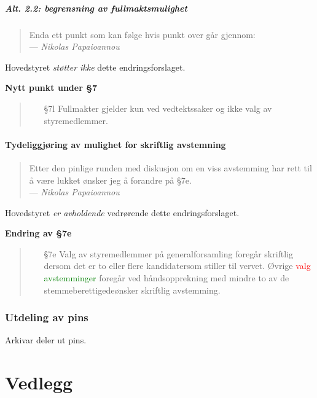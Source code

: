 \documentclass[10pt,norsk,a4paper]{article}
\begin{document}
\subsubsection{Alt. 2.2: begrensning av fullmaktsmulighet\label{sec:begrenset_full}}
\begin{quote}
	Enda ett punkt som kan følge hvis punkt over går gjennom:\\
	--- \emph{Nikolas Papaioannou}
\end{quote}
Hovedstyret \emph{støtter ikke} dette endringsforslaget.

\textbf{Nytt punkt under §7}
\begin{quote}
    \begin{enumerate}
        \item[§7l] Fullmakter gjelder kun ved vedtektssaker og ikke valg av styremedlemmer.
    \end{enumerate}
\end{quote}

\newpage

\subsection{Tydeliggjøring av mulighet for skriftlig avstemning}%
\label{sec:avstemning}

\begin{quote}
	Etter den pinlige runden med diskusjon om en viss avstemming har rett til å være lukket ønsker jeg å forandre på §7e. \\
	--- \emph{Nikolas Papaioannou}
\end{quote}

Hovedstyret \emph{er avholdende} vedrørende dette endringsforslaget.

\textbf{Endring av §7e}
\begin{quote}
    \begin{enumerate}
        \item[§7e]
        Valg av styremedlemmer på generalforsamling foregår skriftlig dersom
        det er to eller flere kandidatersom stiller til vervet. Øvrige
        \textcolor{red}{valg} \textcolor{green}{avstemminger} foregår ved håndsopprekning med mindre
        to av de stemmeberettigedeønsker skriftlig avstemming.
    \end{enumerate}
\end{quote}


\newpage

\section{Utdeling av pins}

Arkivar deler ut pins.


\part*{Vedlegg}\label{lastpage}

\newpage
{}

\end{document}
